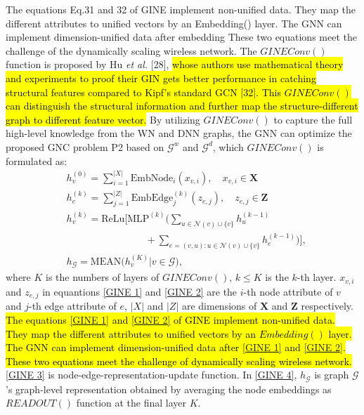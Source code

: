 \documentclass{ar2rc}
\newcommand{\highlight}[1]{\sethlcolor{yellow!50}\hl{#1}}
\begin{document}
The equations Eq.31 and 32 of GINE implement non-unified data. They map the different attributes to unified vectors by an Embedding() layer. The GNN can implement dimension-unified data after embedding These two equations meet the challenge of the dynamically scaling wireless network. The $GINEConv()$ function is proposed by Hu \emph{et al.} [28], \highlight{whose authors use mathematical theory and experiments to proof their GIN gets better performance in catching structural features compared to Kipf's standard GCN [32]. This $GINEConv()$ can distinguish the structural information and further map the structure-different graph to different feature vector.} By utilizing $GINEConv()$ to capture the full high-level knowledge from the WN and DNN graphs, the GNN can optimize the proposed GNC problem P2 based on $\mathcal{G}^{w}$ and $\mathcal{G}^{d}$, which $GINEConv()$ is formulated as:
\begin{align}
   & h_{v}^{(0)}=\sum^{\left | X \right | }_{i=1} \text{EmbNode}_{i} \left( x_{v,i} \right),\quad x_{v,i}\in\mathbf{X} \tag{31} \label{GINE 1} 
   \\&h_{e}^{(k)}=\sum^{\left | Z \right | }_{j=1} \text{EmbEdge}^{(k)}_{j} \left( z_{e,j} \right), \quad z_{e,j}\in\mathbf{Z} \tag{32}\label{GINE 2}
   \\&h_v^{(k)}= \text{ReLu}\Bigg[\text{MLP}^{(k)}\Bigg( \sum^{}_{u \in \mathcal{N}(v)\cup \{v\}}h_{u}^{(k-1)}\nonumber 
   \\&\quad\quad\quad\quad\quad\quad\quad\quad+\sum^{}_{e=(v,u)\colon u \in \mathcal{N}(v)\cup \{v\}}h_{e}^{(k-1)} \Bigg)\Bigg], \tag{33}\label{GINE 3}
   \\&h_{\mathcal{G}}=\text{MEAN}\Big({h_v^{(K)}|v\in \mathcal{G}}\Big),\tag{34} \label{GINE 4}
\end{align}
where $K$ is the numbers of layers of $GINEConv()$, $k$$\leq$$K$ is the $k$-th layer. $x_{v,i}$ and $z_{e,j}$ in equantions \eqref{GINE 1} and \eqref{GINE 2} are the $i$-th node attribute of $v$ and $j$-th edge attribute of $e$, $\left | X \right | $ and $\left | Z \right | $ are dimensions of $\mathbf{X}$ and $\mathbf{Z}$ respectively. \highlight{The equations \eqref{GINE 1} and \eqref{GINE 2} of GINE implement non-unified data. They map the different attributes to unified vectors by an $Embedding()$ layer. The GNN can implement dimension-unified data after \eqref{GINE 1} and \eqref{GINE 2}. These two equations meet the challenge of dynamically scaling wireless network.}
\eqref{GINE 3} is node-edge-representation-update function. In \eqref{GINE 4}, $h_{\mathcal{G}}$ is graph $\mathcal{G}$'s graph-level representation obtained by averaging the node embeddings as $READOUT()$ function at the final layer $K$. 
\end{document}
